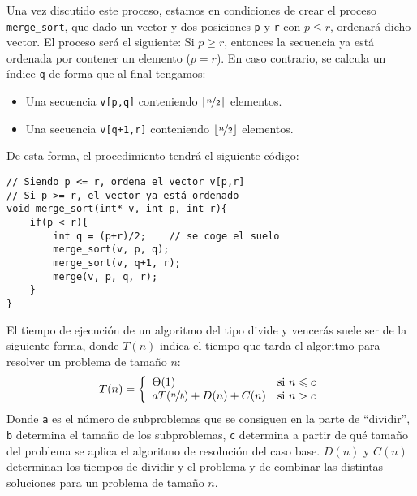 \noindent
Una vez discutido este proceso, estamos en condiciones de crear el proceso \texttt{merge\_sort}, que dado un vector y dos posiciones \texttt{p} y \texttt{r} con $p\leq r$, ordenará dicho vector. El proceso será el siguiente: Si $p \geq r$, entonces la secuencia ya está ordenada por contener un elemento ($p=r$). En caso contrario, se calcula un índice \texttt{q} de forma que al final tengamos:
\begin{itemize}
    \item Una secuencia \texttt{v[p,q]} conteniendo $\lceil \nicefrac{n}{2}\rceil$ elementos.
    \item Una secuencia \texttt{v[q+1,r]} conteniendo $\lfloor \nicefrac{n}{2}\rfloor$ elementos.
\end{itemize}
De esta forma, el procedimiento tendrá el siguiente código:
\begin{verbatim}
// Siendo p <= r, ordena el vector v[p,r]
// Si p >= r, el vector ya está ordenado
void merge_sort(int* v, int p, int r){
    if(p < r){
        int q = (p+r)/2;    // se coge el suelo
        merge_sort(v, p, q);
        merge_sort(v, q+1, r);
        merge(v, p, q, r);
    }
}
\end{verbatim}
El tiempo de ejecución de un algoritmo del tipo divide y vencerás suele ser de la siguiente forma, donde $T(n)$ indica el tiempo que tarda el algoritmo para resolver un problema de tamaño $n$:
\begin{equation*}
    T(n) = \left\{\begin{array}{ll}
            \Theta(1) & \text{si\ } n \leq c \\
            aT(\nicefrac{n}{b}) + D(n) + C(n) & \text{si\ } n > c
    \end{array}\right.
\end{equation*}
Donde \texttt{a} es el número de subproblemas que se consiguen en la parte de ``dividir'', \texttt{b} determina el tamaño de los subproblemas, \texttt{c} determina a partir de qué tamaño del problema se aplica el algoritmo de resolución del caso base. $D(n)$ y $C(n)$ determinan los tiempos de dividir y el problema y de combinar las distintas soluciones para un problema de tamaño $n$.

